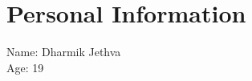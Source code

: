 \documentclass{article}
\begin{document}
    \section{Personal Information}
    Name: Dharmik Jethva \\
    Age: 19
\end{document}

